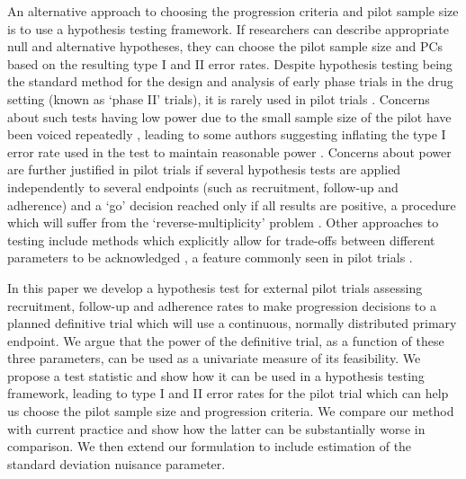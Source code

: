\documentclass[AMA,STIX1COL]{WileyNJD-v2}
\begin{document}
An alternative approach to choosing the progression criteria and pilot sample size is to use a hypothesis testing framework. If researchers can describe appropriate null and alternative hypotheses, they can choose the pilot sample size and PCs based on the resulting type I and II error rates. Despite hypothesis testing being the standard method for the design and analysis of early phase trials in the drug setting (known as `phase II' trials), it is rarely used in pilot trials \cite{Eldridge2016a}. Concerns about such tests having low power due to the small sample size of the pilot have been voiced repeatedly \cite{Lancaster2004, Arain2010, Thabane2010, Eldridge2015}, leading to some authors suggesting inflating the type I error rate used in the test to maintain reasonable power \cite{Cocks2013, Lee2014}. Concerns about power are further justified in pilot trials if several hypothesis tests are applied independently to several endpoints (such as recruitment, follow-up and adherence) and a `go' decision reached only if all results are positive, a procedure which will suffer from the `reverse-multiplicity' problem \cite{Senn2007, Chuang-Stein2007}. Other approaches to testing include methods which explicitly allow for trade-offs between different parameters to be acknowledged \cite{Conaway1996, Thall2008}, a feature commonly seen in pilot trials \cite{Wilson2015}.

In this paper we develop a hypothesis test for external pilot trials assessing recruitment, follow-up and adherence rates to make progression decisions to a planned definitive trial which will use a continuous, normally distributed primary endpoint. We argue that the power of the definitive trial, as a function of these three parameters, can be used as a univariate measure of its feasibility. We propose a test statistic and show how it can be used in a hypothesis testing framework, leading to type I and II error rates for the pilot trial which can help us choose the pilot sample size and progression criteria. We compare our method with current practice and show how the latter can be substantially worse in comparison. We then extend our formulation to include estimation of the standard deviation nuisance parameter.

\end{document}
